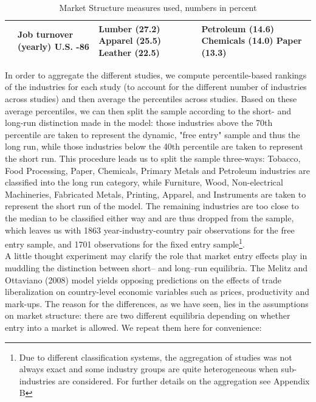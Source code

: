 \begin{center}
\begin{table}
\begin{tabular}{|p{2.8cm}|p{4cm}|p{4cm}|p{4cm}|}
\hline
\citet{Baldwin1994} & Job turnover (yearly) \newline U.S. \newline 73-86 & Lumber (27.2) \newline Apparel (25.5) \newline Leather (22.5) & Petroleum (14.6) \newline Chemicals (14.0) \newline Paper (13.3) \\
\hline   
\end{tabular}\caption{Market Structure measures used, numbers in percent}\label{tb:market_lit}
\end{table} 
\end{center}

In order to aggregate the different studies, we compute percentile-based rankings of the industries for each study (to account for the different number of industries across studies) and then average the percentiles across studies. Based on these average percentiles, we can then split the sample according to the short- and long-run distinction made in the model: those industries above the 70th percentile are taken to represent the dynamic, "free entry" sample and thus the long run, while those industries below the 40th percentile are taken to represent the short run. This procedure leads us to split the sample three-ways: Tobacco, Food Processing, Paper, Chemicals, Primary Metals and Petroleum industries are classified into the long run category, while Furniture, Wood, Non-electrical Machineries, Fabricated Metals, Printing, Apparel, and Instruments are taken to represent the short run of the model. The remaining industries are too close to the median to be classified either way and are thus dropped from the sample, which leaves us with 1863 year-industry-country pair observations for the free entry sample, and 1701 observations for the fixed entry sample\footnote{Due to different classification systems, the aggregation of studies was not always exact and some industry groups are quite heterogeneous when sub-industries are considered. For further details on the aggregation see Appendix B}. \\
A little thought experiment may clarify the role that market entry effects play in muddling the distinction between short-- and long--run equilibria. The Melitz and Ottaviano (2008) model yields opposing predictions on the effects of trade liberalization on country-level economic variables such as prices, productivity and mark-ups. The reason for the differences, as we have seen, lies in the assumptions on market structure: there are two different equilibria depending on whether entry into a market is allowed. We repeat them here for convenience:
